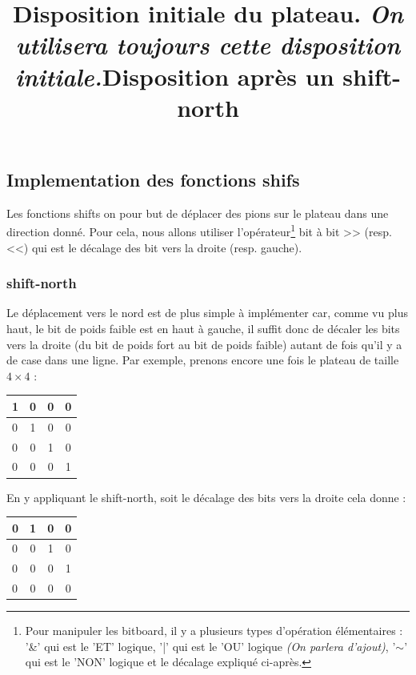 \documentclass{report}
\begin{document}
\subsection{Implementation des fonctions shifs}

Les fonctions shifts on pour but de déplacer des pions sur le plateau dans une direction donné. Pour cela, nous allons utiliser l'opérateur\footnote{Pour manipuler les bitboard, il y a plusieurs types d'opération élémentaires : '\&' qui est le 'ET' logique, '|' qui est le 'OU' logique \textit{(On parlera d'ajout)}, '$\sim$' qui est le 'NON' logique et le décalage expliqué ci-après. } bit à bit >> (resp. <<) qui est le décalage des bit vers la droite (resp. gauche).

\subsubsection{shift-north}

Le déplacement vers le nord est de plus simple à implémenter car, comme vu plus haut, le bit de poids faible est en haut à gauche, il suffit donc de décaler les bits vers la droite (du bit de poids fort au bit de poids faible) autant de fois qu'il y a de case dans une ligne.
Par exemple, prenons encore une fois le plateau de taille $4\times4$ :

\begin{center}
\renewcommand{\arraystretch} {1.5}
    \begin{tabular}{|p{0.2cm}|c|c|c|}
        \hline
        1 & 0 & 0 & 0\\
        \hline
        0 & 1 & 0 & 0 \\
        \hline
        0 & 0 & 1 & 0 \\
        \hline
        0 & 0 & 0 & 1 \\
        \hline
    \end{tabular}

\end{center}
\begin{center}
        \title{Disposition initiale du plateau. \textit{On utilisera toujours cette disposition initiale.}}
\end{center}

En y appliquant le shift-north, soit le décalage des bits vers la droite cela donne :

\begin{center}
\renewcommand{\arraystretch} {1.5}
    \begin{tabular}{|p{0.2cm}|c|c|c|}
        \hline
        0 & 1 & 0 & 0\\
        \hline
        0 & 0 & 1 & 0 \\
        \hline
        0 & 0 & 0 & 1 \\
        \hline
        0 & 0 & 0 & 0 \\
        \hline
    \end{tabular}

\end{center}
\begin{center}
        \title{Disposition après un shift-north}
\end{center}
\end{document}
